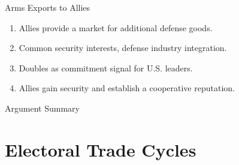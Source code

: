 \documentclass[12pt]{beamer}
\begin{document}

\begin{frame}{Arms Exports to Allies}

\pause 
\begin{enumerate} 
\item Allies provide a market for additional defense goods.
\pause 
\item Common security interests, defense industry integration. 
\pause
\item Doubles as commitment signal for U.S. leaders. 
\pause
\item Allies gain security and establish a cooperative reputation.
\end{enumerate}


\end{frame} 


\begin{frame}[fragile]{Argument Summary}

\begin{figure}[htpb]
\end{figure}

\end{frame} 

%
%
%
%



\section{Electoral Trade Cycles} 
\end{document}
